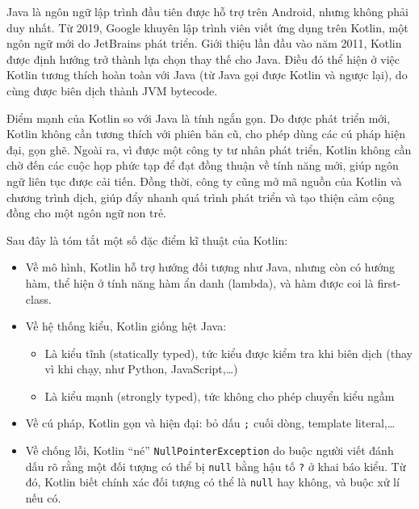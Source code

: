 \documentclass[../../thesis]{subfiles}
\begin{document}
Java là ngôn ngữ lập trình đầu tiên được hỗ trợ trên Android, nhưng không phải
duy nhất. Từ 2019, Google khuyên lập trình viên viết ứng dụng trên Kotlin, một
ngôn ngữ mới do JetBrains phát triển. Giới thiệu lần đầu vào năm 2011, Kotlin
được định hướng trở thành lựa chọn thay thế cho Java. Điều đó thể hiện ở việc
Kotlin tương thích hoàn toàn với Java (từ Java gọi được Kotlin và ngược lại), do
cùng được biên dịch thành JVM bytecode.

Điểm mạnh của Kotlin so với Java là tính ngắn gọn. Do được phát triển mới,
Kotlin không cần tương thích với phiên bản cũ, cho phép dùng các cú pháp hiện
đại, gọn ghẽ. Ngoài ra, vì được một công ty tư nhân phát triển, Kotlin không cần
chờ đến các cuộc họp phức tạp để đạt đồng thuận về tính năng mới, giúp ngôn ngữ
liên tục được cải tiến. Đồng thời, công ty cũng mở mã nguồn của Kotlin và chương
trình dịch, giúp đẩy nhanh quá trình phát triển và tạo thiện cảm cộng đồng cho
một ngôn ngữ non trẻ.

Sau đây là tóm tắt một số đặc điểm kĩ thuật của Kotlin:

\begin{itemize}
    \item
        Về mô hình, Kotlin hỗ trợ hướng đối tượng như Java, nhưng còn có hướng
        hàm, thể hiện ở tính năng hàm ẩn danh (lambda), và hàm được coi là
        first-class.
    \item
        Về hệ thống kiểu, Kotlin giống hệt Java:

        \begin{itemize}
            \item
                Là kiểu tĩnh (statically typed), tức kiểu được kiểm tra khi biên
                dịch (thay vì khi chạy, như Python, JavaScript,\ldots)
            \item
                Là kiểu mạnh (strongly typed), tức không cho phép chuyển kiểu
                ngầm
        \end{itemize}
    \item
        Về cú pháp, Kotlin gọn và hiện đại: bỏ dấu \texttt{;} cuối dòng,
        template literal,\ldots
    \item
        Về chống lỗi, Kotlin ``né'' \texttt{NullPointerException} do buộc người
        viết đánh dấu rõ rằng một đối tượng có thể bị \texttt{null} bằng hậu tố
        \texttt{?} ở khai báo kiểu. Từ đó, Kotlin biết chính xác đối tượng có
        thể là \texttt{null} hay không, và buộc xử lí nếu có.
\end{itemize}
\end{document}
